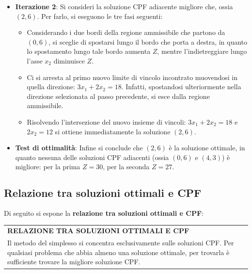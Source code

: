 \documentclass[a4paper]{extarticle}
\renewcommand\arraystretch{}
\begin{document}
\begin{itemize}
    \item \textbf{Iterazione 2}: Si consideri la soluzione CPF adiacente migliore che, ossia $(2,6)$. Per farlo, si eseguono le tre fasi seguenti:
    \begin{itemize}
        \item Considerando i due bordi della regione ammissibile che partono da $(0,6)$, si sceglie di spostarsi lungo il bordo che porta a destra, in quanto lo spostamento lungo tale bordo aumenta $Z$, mentre l'indietreggiare lungo l'asse $x_2$ diminuisce $Z$.
        \item Ci si arresta al primo nuovo limite di vincolo incontrato muovendosi in quella direzione: $3x_1 + 2x_2 = 18$. Infatti, spostandosi ulteriormente nella direzione selezionata al passo precedente, si esce dalla regione ammissibile.
        \item Risolvendo l'intersezione del nuovo insieme di vincoli: $3x_1 + 2x_2 = 18$ e $2x_2 = 12$ si ottiene immediatamente la soluzione $(2,6)$.
    \end{itemize}
    \item \textbf{Test di ottimalità}: Infine si conclude che $(2,6)$ è la soluzione ottimale, in quanto nessuna delle soluzioni CPF adiacenti (ossia $(0,6)$ e $(4,3)$) è migliore: per la prima $Z=30$, per la seconda $Z=27$.
\end{itemize}

\vspace{1em}
\noindent
\subsection{Relazione tra soluzioni ottimali e CPF}
Di seguito si espone la \textbf{relazione tra soluzioni ottimali e CPF}:

\vspace{1em}
\setlength{\tabcolsep}{14pt}
\renewcommand{\arraystretch}{2}
\noindent
\begin{tabularx}{\textwidth}{@{}|P|@{}}
    \hline
    {\textbf{RELAZIONE TRA SOLUZIONI OTTIMALI E CPF}}\\
    \parbox{\linewidth}{Il metodo del simplesso si concentra esclusivamente sulle soluzioni CPF. Per qualsiasi problema che abbia almeno una soluzione ottimale, per trovarla è sufficiente trovare la migliore soluzione CPF. \vspace{3mm}}\\
    \hline
\end{tabularx}
\end{document}
